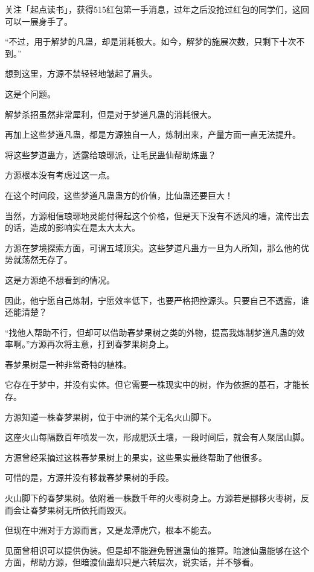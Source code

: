 
\begin{this_body}



关注「起点读书」，获得515红包第一手消息，过年之后没抢过红包的同学们，这回可以一展身手了。

“不过，用于解梦的凡蛊，却是消耗极大。如今，解梦的施展次数，只剩下十次不到。”

想到这里，方源不禁轻轻地皱起了眉头。

这是个问题。

解梦杀招虽然非常犀利，但是对于梦道凡蛊的消耗很大。

再加上这些梦道凡蛊，都是方源独自一人，炼制出来，产量方面一直无法提升。

将这些梦道蛊方，透露给琅琊派，让毛民蛊仙帮助炼蛊？

方源根本没有考虑过这一点。

在这个时间段，这些梦道凡蛊蛊方的价值，比仙蛊还要巨大！

当然，方源相信琅琊地灵能付得起这个价格，但是天下没有不透风的墙，流传出去的话，造成的影响实在是太大太大。

方源在梦境探索方面，可谓五域顶尖。这些梦道凡蛊方一旦为人所知，那么他的优势就荡然无存了。

这是方源绝不想看到的情况。

因此，他宁愿自己炼制，宁愿效率低下，也要严格把控源头。只要自己不透露，谁还能清楚？

“找他人帮助不行，但却可以借助春梦果树之类的外物，提高我炼制梦道凡蛊的效率啊。”方源再次将主意，打到春梦果树身上。

春梦果树是一种非常奇特的植株。

它存在于梦中，并没有实体。但它需要一株现实中的树，作为依据的基石，才能长存。

方源知道一株春梦果树，位于中洲的某个无名火山脚下。

这座火山每隔数百年喷发一次，形成肥沃土壤，一段时间后，就会有人聚居山脚。

方源曾经采摘过这株春梦果树上的果实，这些果实最终帮助了他很多。

可惜的是，方源并没有移栽春梦果树的手段。

火山脚下的春梦果树。依附着一株数千年的火枣树身上。方源若是挪移火枣树，反而会让春梦果树无所依托而毁灭。

但现在中洲对于方源而言，又是龙潭虎穴，根本不能去。

见面曾相识可以提供伪装。但是却不能避免智道蛊仙的推算。暗渡仙蛊能够在这个方面，帮助方源，但暗渡仙蛊却只是六转层次，说实话，并不够看。


\end{this_body}
